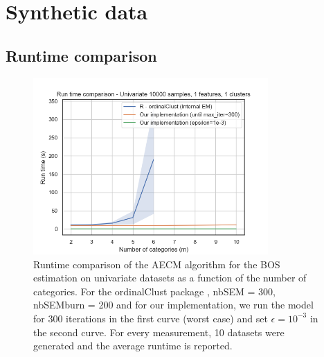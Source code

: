 \section{Synthetic data}
\label{appendix:metrics_synth}

\subsection{Runtime comparison}
\label{appendix:runtime}

\begin{figure}[H]
    \centering
    \includegraphics[width=0.8\textwidth]{python_figures/run_time_comparison_univariate_epsilon.png}
    \caption{Runtime comparison of the AECM algorithm for the BOS estimation on univariate datasets as a function of the number of categories. For the ordinalClust package \cite{selosse2021ordinalclust}, nbSEM = 300, nbSEMburn = 200 and for our implementation, we run the model for $300$ iterations in the first curve (worst case) and set $\epsilon = 10^{-3}$ in the second curve. For every measurement, 10 datasets were generated and the average runtime is reported.}
\end{figure}

